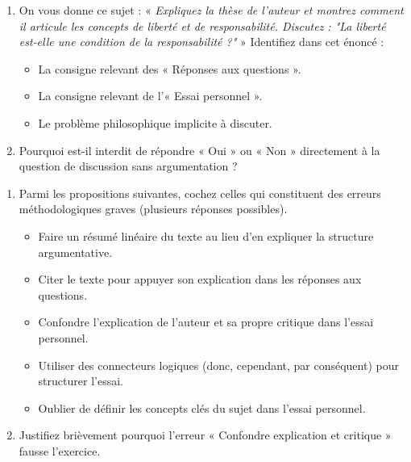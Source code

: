 \documentclass[11pt]{article}
\begin{document}
\begin{exercice}
\begin{enumerate}
    \item On vous donne ce sujet : « \textit{Expliquez la thèse de l'auteur et montrez comment il articule les concepts de liberté et de responsabilité. Discutez : "La liberté est-elle une condition de la responsabilité ?"} »
    Identifiez dans cet énoncé :
    \begin{itemize}
        \item[a.] La consigne relevant des « Réponses aux questions ».
        \item[b.] La consigne relevant de l'« Essai personnel ».
        \item[c.] Le problème philosophique implicite à discuter.
    \end{itemize}
    \item Pourquoi est-il interdit de répondre « Oui » ou « Non » directement à la question de discussion sans argumentation ?
\end{enumerate}
\end{exercice}

\begin{exercice}
\begin{enumerate}
    \item Parmi les propositions suivantes, cochez celles qui constituent des erreurs méthodologiques graves (plusieurs réponses possibles).
    \begin{itemize}
        \item[$\square$] Faire un résumé linéaire du texte au lieu d'en expliquer la structure argumentative.
        \item[$\square$] Citer le texte pour appuyer son explication dans les réponses aux questions.
        \item[$\square$] Confondre l'explication de l'auteur et sa propre critique dans l'essai personnel.
        \item[$\square$] Utiliser des connecteurs logiques (donc, cependant, par conséquent) pour structurer l'essai.
        \item[$\square$] Oublier de définir les concepts clés du sujet dans l'essai personnel.
    \end{itemize}
    \item Justifiez brièvement pourquoi l'erreur « Confondre explication et critique » fausse l'exercice.
\end{enumerate}
\end{exercice}
\end{document}
